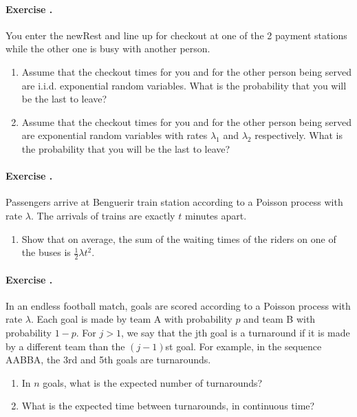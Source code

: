 \documentclass[twocolumn,12pt,a4paper]{article}
\newcounter{num}  %
\begin{document}
	\paragraph{Exercise \thenum.}
	You enter the newRest and line up for checkout at one of the 2 payment stations while the other one is busy with another person.
	\begin{enumerate}
		\item Assume that the checkout times for you and for the other person being served are i.i.d. exponential random variables. What is the probability that you will be the last to leave?
		\item Assume that the checkout times for you and for the other person being served are exponential random variables with rates $\lambda_1$ and $\lambda_2$ respectively. 
		What is the probability that you will be the last to leave?
	\end{enumerate}
	
	\paragraph{Exercise \thenum.}
	Passengers arrive at Benguerir train station according to a Poisson process with rate $\lambda$. The arrivals of trains are exactly $t$ minutes apart. 
	\begin{enumerate}
		\item 
	Show that on average, the sum of the waiting times of the riders on one of the buses is $\frac 1 2 \lambda t^2$.
	\end{enumerate}
	
	
	
	\paragraph{Exercise \thenum.}
	In an endless football match, goals are scored according to a Poisson process with rate $\lambda$.
	Each goal is made by team A with probability $p$ and team B with probability $1 - p$. 
	For $j > 1$, we say that the jth goal is a turnaround if it is made by a different team than the $(j - 1)$st goal. 
	For example, in the sequence AABBA, the 3rd and 5th goals are
	turnarounds.
	\begin{enumerate}
		\item In $n$ goals, what is the expected number of turnarounds?
		\item What is the expected time between turnarounds, in continuous time?
	\end{enumerate}
	
\end{document}
